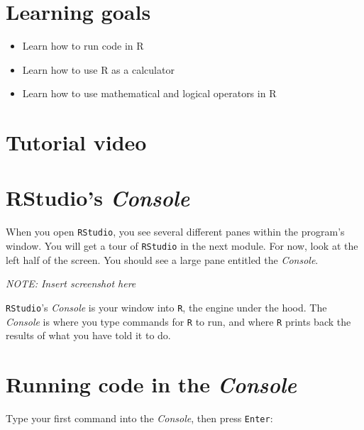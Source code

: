 \documentclass[
]{book}
\providecommand{\tightlist}{%
  \setlength{\itemsep}{0pt}\setlength{\parskip}{0pt}}
\begin{document}
\hypertarget{learning-goals}{%
\section*{Learning goals}\label{learning-goals}}

\begin{itemize}
\tightlist
\item
  Learn how to run code in R
\item
  Learn how to use R as a calculator
\item
  Learn how to use mathematical and logical operators in R
\end{itemize}

\hypertarget{tutorial-video}{%
\section*{Tutorial video}\label{tutorial-video}}

\hypertarget{rstudios-console}{%
\section*{\texorpdfstring{RStudio's \emph{Console}}{RStudio's Console}}\label{rstudios-console}}

When you open \texttt{RStudio}, you see several different panes within the program's window. You will get a tour of \texttt{RStudio} in the next module. For now, look at the left half of the screen. You should see a large pane entitled the \emph{Console}.

\emph{NOTE: Insert screenshot here}

\texttt{RStudio}'s \emph{Console} is your window into \texttt{R}, the engine under the hood. The \emph{Console} is where you type commands for \texttt{R} to run, and where \texttt{R} prints back the results of what you have told it to do.

\hypertarget{running-code-in-the-console}{%
\section*{\texorpdfstring{Running code in the \emph{Console}}{Running code in the Console}}\label{running-code-in-the-console}}

Type your first command into the \emph{Console}, then press \texttt{Enter}:
\end{document}
